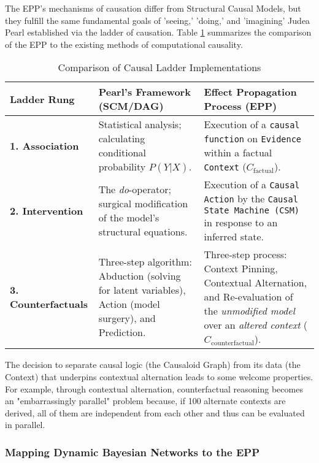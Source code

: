 The EPP's mechanisms of causation differ from Structural Causal Models, 
but they fulfill the same fundamental goals of 'seeing,' 'doing,' and 'imagining' Judea Pearl established
via the ladder of causation. Table \ref{tab:ladder_comparison} summarizes the comparison of the EPP to the existing methods of computational causality.
 

\begin{table}[h!]
\centering
\caption{Comparison of Causal Ladder Implementations}
\label{tab:ladder_comparison}
\begin{tabular}{|l|p{5.5cm}|p{5.5cm}|}
\hline
\textbf{Ladder Rung} & \textbf{Pearl's Framework (SCM/DAG)} & \textbf{Effect Propagation Process (EPP)} \\
\hline
\textbf{1. Association} &
Statistical analysis; calculating conditional probability $P(Y|X)$. &
Execution of a \texttt{causal function} on \texttt{Evidence} within a factual \texttt{Context} ($C_{\text{factual}}$). \\
\hline
\textbf{2. Intervention} &
The \textit{do}-operator; surgical modification of the model's structural equations. &
Execution of a \texttt{Causal Action} by the \texttt{Causal State Machine (CSM)} in response to an inferred state. \\
\hline
\textbf{3. Counterfactuals} &
Three-step algorithm: Abduction (solving for latent variables), Action (model surgery), and Prediction. &
Three-step process: Context Pinning, Contextual Alternation, and Re-evaluation of the \textit{unmodified model} over an \textit{altered context} ($C_{\text{counterfactual}}$). \\
\hline
\end{tabular}
\end{table}

The decision to separate causal logic (the Causaloid Graph) from its data (the Context) that underpins
contextual alternation leads to some welcome properties. For example, through contextual alternation,  counterfactual reasoning becomes an "embarrassingly parallel" problem because, if 100 alternate contexts are derived, all of them are independent from each other and thus can be evaluated in parallel. 

%
%
\subsubsection{Mapping Dynamic Bayesian Networks to the EPP}
\label{sec:epp_Dynamic_Bayesian_Networks}

